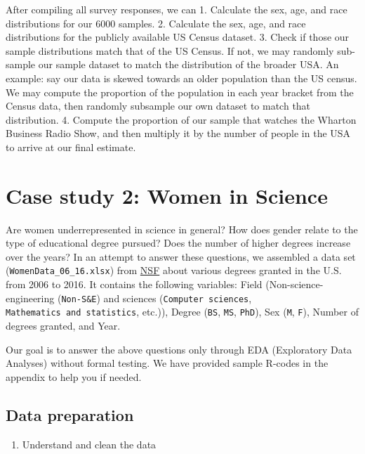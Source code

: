\documentclass[
]{article}
\providecommand{\tightlist}{%
  \setlength{\itemsep}{0pt}\setlength{\parskip}{0pt}}
\begin{document}
After compiling all survey responses, we can 1. Calculate the sex, age,
and race distributions for our 6000 samples. 2. Calculate the sex, age,
and race distributions for the publicly available US Census dataset. 3.
Check if those our sample distributions match that of the US Census. If
not, we may randomly sub-sample our sample dataset to match the
distribution of the broader USA. An example: say our data is skewed
towards an older population than the US census. We may compute the
proportion of the population in each year bracket from the Census data,
then randomly subsample our own dataset to match that distribution. 4.
Compute the proportion of our sample that watches the Wharton Business
Radio Show, and then multiply it by the number of people in the USA to
arrive at our final estimate.

\hypertarget{case-study-2-women-in-science}{%
\section{Case study 2: Women in
Science}\label{case-study-2-women-in-science}}

Are women underrepresented in science in general? How does gender relate
to the type of educational degree pursued? Does the number of higher
degrees increase over the years? In an attempt to answer these
questions, we assembled a data set (\texttt{WomenData\_06\_16.xlsx})
from
\href{https://ncses.nsf.gov/pubs/nsf19304/digest/field-of-degree-women}{NSF}
about various degrees granted in the U.S. from 2006 to 2016. It contains
the following variables: Field (Non-science-engineering
(\texttt{Non-S\&E}) and sciences (\texttt{Computer\ sciences},
\texttt{Mathematics\ and\ statistics}, etc.)), Degree (\texttt{BS},
\texttt{MS}, \texttt{PhD}), Sex (\texttt{M}, \texttt{F}), Number of
degrees granted, and Year.

Our goal is to answer the above questions only through EDA (Exploratory
Data Analyses) without formal testing. We have provided sample R-codes
in the appendix to help you if needed.

\hypertarget{data-preparation-1}{%
\subsection{Data preparation}\label{data-preparation-1}}

\begin{enumerate}
\def\labelenumi{\arabic{enumi}.}
\tightlist
\item
  Understand and clean the data
\end{enumerate}
\end{document}
